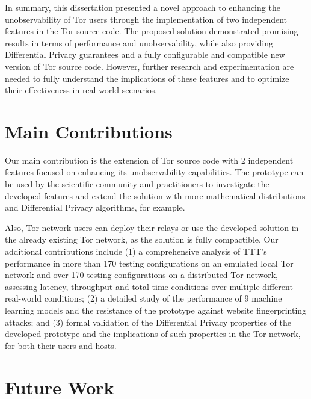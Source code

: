 In summary, this dissertation presented a novel approach to enhancing the unobservability of Tor users through the implementation of two independent features in the Tor source code. The proposed solution demonstrated promising results in terms of performance and unobservability, while also providing Differential Privacy guarantees and a fully configurable and compatible new version of Tor source code. However, further research and experimentation are needed to fully understand the implications of these features and to optimize their effectiveness in real-world scenarios.


\section{Main Contributions}\label{sec:main_conclusions}

Our main contribution is the extension of Tor source code with 2 independent features focused on enhancing its unobservability capabilities. The prototype can be used by the scientific community and practitioners to investigate the developed features and extend the solution with more mathematical distributions and Differential Privacy algorithms, for example. 

Also, Tor network users can deploy their relays or use the developed solution in the already existing Tor network, as the solution is fully compactible. Our additional contributions include  (1) a comprehensive analysis of TTT's performance in more than 170 testing configurations on an emulated local Tor network and over 170 testing configurations on a distributed Tor network, assessing latency, throughput and total time conditions over multiple different real-world conditions; (2) a detailed study of the performance of 9 machine learning models and the resistance of the prototype against website fingerprinting attacks; and (3) formal validation of the Differential Privacy properties of the developed prototype and the implications of such properties in the Tor network, for both their users and hosts.

\section{Future Work}\label{sec:future_work}

